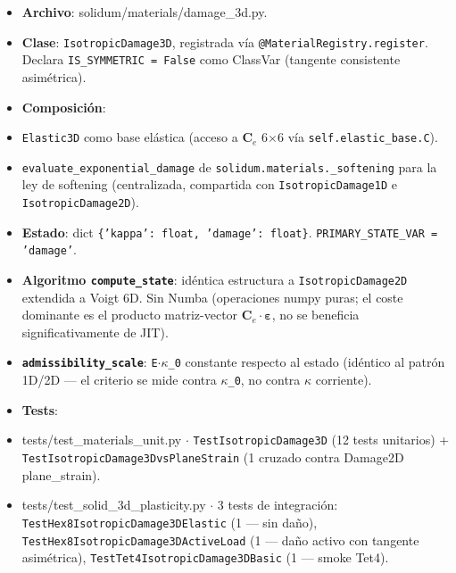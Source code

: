 \documentclass[11pt,letterpaper,oneside]{report}
\begin{document}
\begin{itemize}
  \item \textbf{Archivo}: solidum/materials/damage\_3d.py.
  \item \textbf{Clase}: \texttt{IsotropicDamage3D}, registrada vía \texttt{@MaterialRegistry.register}. Declara \texttt{IS\_SYMMETRIC = False} como ClassVar (tangente consistente asimétrica).
  \item \textbf{Composición}:
  \item \texttt{Elastic3D} como base elástica (acceso a $\mathbf C_e$ 6\ensuremath{\times}6 vía \texttt{self.elastic\_base.C}).
  \item \texttt{evaluate\_exponential\_damage} de \texttt{solidum.materials.\_softening} para la ley de softening (centralizada, compartida con \texttt{IsotropicDamage1D} e \texttt{IsotropicDamage2D}).
  \item \textbf{Estado}: dict \texttt{\{'kappa': float, 'damage': float\}}. \texttt{PRIMARY\_STATE\_VAR = 'damage'}.
  \item \textbf{Algoritmo \texttt{compute\_state}}: idéntica estructura a \texttt{IsotropicDamage2D} extendida a Voigt 6D. Sin Numba (operaciones numpy puras; el coste dominante es el producto matriz-vector $\mathbf C_e \cdot \boldsymbol\varepsilon$, no se beneficia significativamente de JIT).
  \item \textbf{\texttt{admissibility\_scale}}: \texttt{E\ensuremath{\cdot}\ensuremath{\kappa}\_0} constante respecto al estado (idéntico al patrón 1D/2D --- el criterio se mide contra \texttt{\ensuremath{\kappa}\_0}, no contra \texttt{\ensuremath{\kappa}} corriente).
  \item \textbf{Tests}:
  \item tests/test\_materials\_unit.py \ensuremath{\cdot} \texttt{TestIsotropicDamage3D} (12 tests unitarios) + \texttt{TestIsotropicDamage3DvsPlaneStrain} (1 cruzado contra Damage2D plane\_strain).
  \item tests/test\_solid\_3d\_plasticity.py \ensuremath{\cdot} 3 tests de integración: \texttt{TestHex8IsotropicDamage3DElastic} (1 --- sin daño), \texttt{TestHex8IsotropicDamage3DActiveLoad} (1 --- daño activo con tangente asimétrica), \texttt{TestTet4IsotropicDamage3DBasic} (1 --- smoke Tet4).
\end{itemize}
\end{document}
